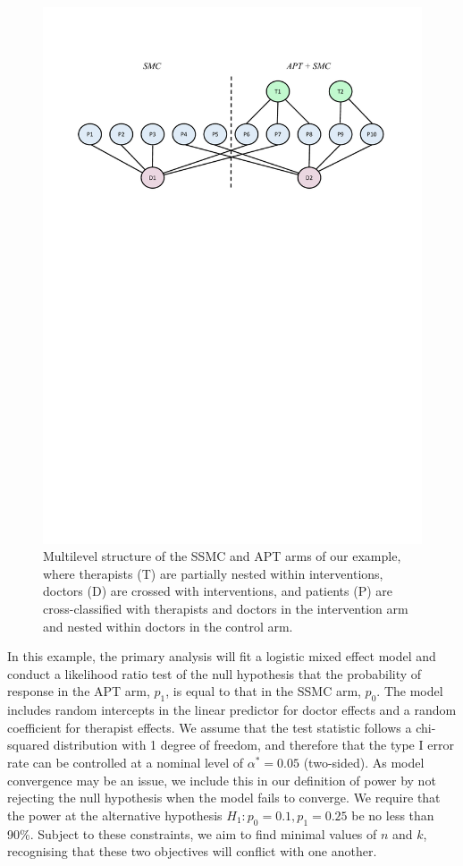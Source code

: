 \documentclass[]{sagej}
\begin{document}
\begin{figure}
\centering
\includegraphics[scale=0.7, trim={1.9cm 19cm 0 0}, clip]{./Figures/ex1_structure.pdf}
\caption{Multilevel structure of the SSMC and APT arms of our example, where therapists (T) are partially nested within interventions, doctors (D) are crossed with interventions, and patients (P) are cross-classified with therapists and doctors in the intervention arm and nested within doctors in the control arm.}
\label{fig:ex1_structure}
\end{figure}

In this example, the primary analysis will fit a logistic mixed effect model and conduct a likelihood ratio test of the null hypothesis that the probability of response in the APT arm, $p_1$, is equal to that in the SSMC arm, $p_0$. The model includes random intercepts in the linear predictor for doctor effects and a random coefficient for therapist effects. We assume that the test statistic follows a chi-squared distribution with 1 degree of freedom, and therefore that the type I error rate can be controlled at a nominal level of $\alpha^* = 0.05$ (two-sided). As model convergence may be an issue, we include this in our definition of power by not rejecting the null hypothesis when the model fails to converge. We require that the power at the alternative hypothesis $H_1: p_0=0.1, p_1=0.25$ be no less than 90\%. Subject to these constraints, we aim to find minimal values of $n$ and $k$, recognising that these two objectives will conflict with one another. 
\end{document}
